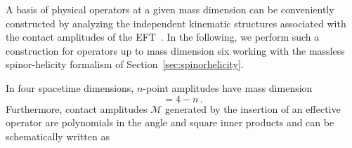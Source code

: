 A basis of physical operators at a given mass dimension can be conveniently constructed by analyzing the independent kinematic structures associated with the contact amplitudes of the EFT~\cite{Shadmi:2018xan,Cheung:2016drk,Falkowski:2019zdo,Durieux:2019siw,Li:2022tec,DeAngelis:2022qco,Durieux:2019eor}.
In the following, we perform such a construction for operators up to mass dimension six working with the massless spinor-helicity formalism of Section~\ref{sec:spinorhelicity}.

In four spacetime dimensions, $n$-point amplitudes have mass dimension
\begin{equation}
    [\mathcal M_n]=4-n\,.
\end{equation}
Furthermore, contact amplitudes $\mathcal{M}$ generated by the insertion of an effective operator are polynomials in the angle and square inner products and can be schematically written as
